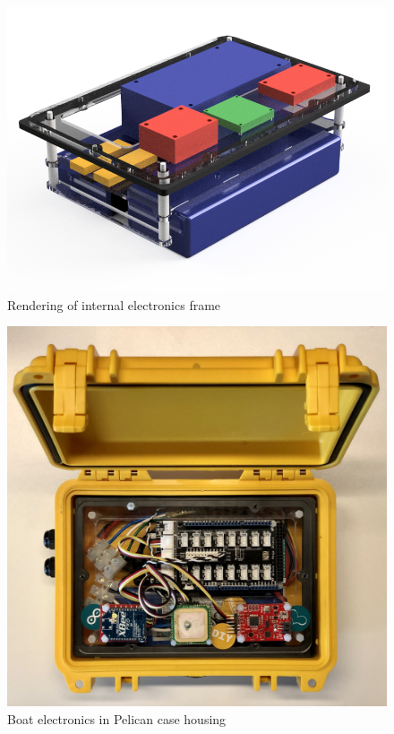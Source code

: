 \documentclass[a4paper]{IEEEtran}
\begin{document}
\begin{figure}
\includegraphics[width=\columnwidth]{assembly.png}
\caption{Rendering of internal electronics frame}
\label{elecframe}
\end{figure}

\begin{figure}[h!]
\includegraphics[width=\columnwidth]{boat-hardware.jpg}
\caption{Boat electronics in Pelican case housing}
\label{boathardware}
\end{figure}
\end{document}
